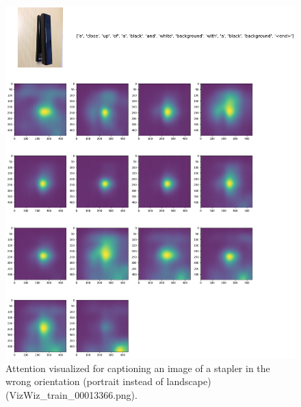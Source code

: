 \documentclass[11pt,a4paper]{article}
\begin{document}
\begin{figure}[ht]
  \includegraphics[width=\linewidth]{VizWiz_train_00013366.png}
  \caption{Attention visualized for captioning an image of a stapler in the wrong orientation (portrait instead of landscape)(VizWiz\_train\_00013366.png).}
  \label{fig:stapler}
\end{figure}
\end{document}
